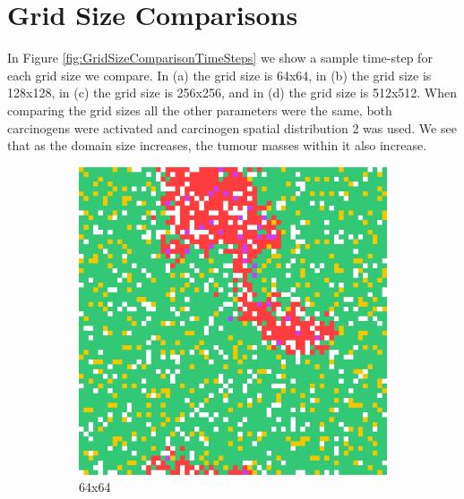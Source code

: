 \documentclass[\main/thesis.tex]{subfiles}
\begin{document}
\section{Grid Size Comparisons}
In Figure \ref{fig:GridSizeComparisonTimeSteps} we show a sample time-step for each grid size we compare. In (a) the grid size is 64x64, in (b) the grid size is 128x128, in (c) the grid size is 256x256, and in (d) the grid size is 512x512. When comparing the grid sizes all the other parameters were the same, both carcinogens were activated and carcinogen spatial distribution 2 was used. We see that as the domain size increases, the tumour masses within it also increase.
\begin{figure}[H]
    \centering
    \begin{subfigure}[t]{.47\textwidth}
        \centering
        \includegraphics[width=\textwidth]{images/3_GridSizeComparison/Fig1/1_64x64.jpeg}
        \caption{64x64}
        \label{fig:64x64TimeStep}
    \end{subfigure}
    \begin{subfigure}[t]{.47\textwidth}
        \centering

\end{subfigure}
\end{figure}
\end{document}
